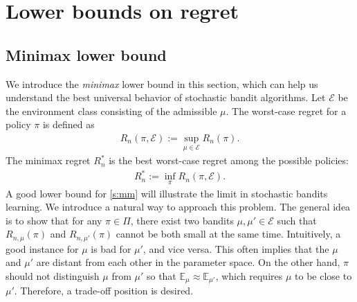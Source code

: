 \documentclass[letterpaper,10pt,openright,openany]{book}
\numberwithin{equation}{section}
\theoremstyle{plain}
\theoremstyle{definition}
\def\E{{\mathbb E}}
\def\V{{\mathcal E}}
\def\e{{\varepsilon}}
\begin{document}



\section{Lower bounds on regret}

\subsection{Minimax lower bound}

We introduce the \emph{minimax} lower bound in this section, which can help us understand the best universal behavior of stochastic bandit algorithms. Let $\V$ be the environment class consisting of the admissible $\mu$. The worst-case regret for a policy $\pi$ is defined as 
\begin{align*}
R_n(\pi, \V):=\sup_{\mu\in\V}R_n(\pi).
\end{align*}
The minimax regret $R_n^*$ is the best worst-case regret among the possible policies: 
\begin{align}
R_n^*:=\inf_{\pi}R_n(\pi, \V).\label{s:mm}
\end{align}
A good lower bound for \eqref{s:mm} will illustrate the limit in stochastic bandits learning. We introduce a natural way to approach this problem.  The general idea is to show that for any $\pi\in\Pi$, there exist two bandits $\mu, \mu'\in\V$ such that $R_{n,\mu}(\pi)$ and $R_{n,\mu'}(\pi)$ cannot be both small at the same time. Intuitively, a good instance for $\mu$ is bad for $\mu'$, and vice versa. This often implies that the $\mu$ and $\mu'$ are distant from each other in the parameter space. On the other hand, $\pi$ should not distinguish $\mu$ from $\mu'$ so that $\E_\mu\approx\E_{\mu'}$, which requires $\mu$ to be close to $\mu'$. Therefore, a trade-off position is desired.  
\end{document}
